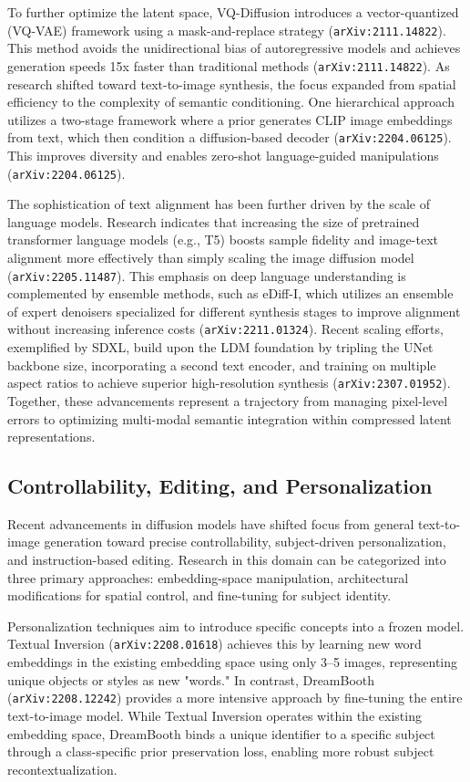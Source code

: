 \documentclass[11pt]{article}
\begin{document}
To further optimize the latent space, VQ-Diffusion introduces a vector-quantized (VQ-VAE) framework using a mask-and-replace strategy (\texttt{arXiv:2111.14822}). This method avoids the unidirectional bias of autoregressive models and achieves generation speeds 15x faster than traditional methods (\texttt{arXiv:2111.14822}). As research shifted toward text-to-image synthesis, the focus expanded from spatial efficiency to the complexity of semantic conditioning. One hierarchical approach utilizes a two-stage framework where a prior generates CLIP image embeddings from text, which then condition a diffusion-based decoder (\texttt{arXiv:2204.06125}). This improves diversity and enables zero-shot language-guided manipulations (\texttt{arXiv:2204.06125}).

The sophistication of text alignment has been further driven by the scale of language models. Research indicates that increasing the size of pretrained transformer language models (e.g., T5) boosts sample fidelity and image-text alignment more effectively than simply scaling the image diffusion model (\texttt{arXiv:2205.11487}). This emphasis on deep language understanding is complemented by ensemble methods, such as eDiff-I, which utilizes an ensemble of expert denoisers specialized for different synthesis stages to improve alignment without increasing inference costs (\texttt{arXiv:2211.01324}). Recent scaling efforts, exemplified by SDXL, build upon the LDM foundation by tripling the UNet backbone size, incorporating a second text encoder, and training on multiple aspect ratios to achieve superior high-resolution synthesis (\texttt{arXiv:2307.01952}). Together, these advancements represent a trajectory from managing pixel-level errors to optimizing multi-modal semantic integration within compressed latent representations.

\subsection{Controllability, Editing, and Personalization}

Recent advancements in diffusion models have shifted focus from general text-to-image generation toward precise controllability, subject-driven personalization, and instruction-based editing. Research in this domain can be categorized into three primary approaches: embedding-space manipulation, architectural modifications for spatial control, and fine-tuning for subject identity.

Personalization techniques aim to introduce specific concepts into a frozen model. Textual Inversion (\texttt{arXiv:2208.01618}) achieves this by learning new word embeddings in the existing embedding space using only 3–5 images, representing unique objects or styles as new "words." In contrast, DreamBooth (\texttt{arXiv:2208.12242}) provides a more intensive approach by fine-tuning the entire text-to-image model. While Textual Inversion operates within the existing embedding space, DreamBooth binds a unique identifier to a specific subject through a class-specific prior preservation loss, enabling more robust subject recontextualization.
\end{document}
